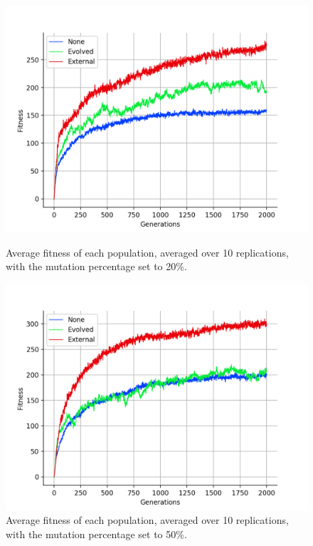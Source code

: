 \documentclass[12pt,a4paper,twoside,openright]{report}
\begin{document}
\begin{figure}[t]
   \centering
   \begin{minipage}{0.49\textwidth}
          \centering
          \captionsetup{width=.9\linewidth}
          \includegraphics[width=1.\linewidth]{results/average-mut20.png}
          \caption{Average fitness of each population, averaged over 10 replications, with the mutation percentage set to 20\%.}
          \label{fig:average-mut20}
   \end{minipage}
   \begin{minipage}{0.49\textwidth}
          \centering
          \captionsetup{width=.9\linewidth}
          \includegraphics[width=1.\linewidth]{results/average-mut50.png}
          \caption{Average fitness of each population, averaged over 10 replications, with the mutation percentage set to 50\%.}
          \label{fig:average-mut50}
   \end{minipage}
\end{figure}
\end{document}
